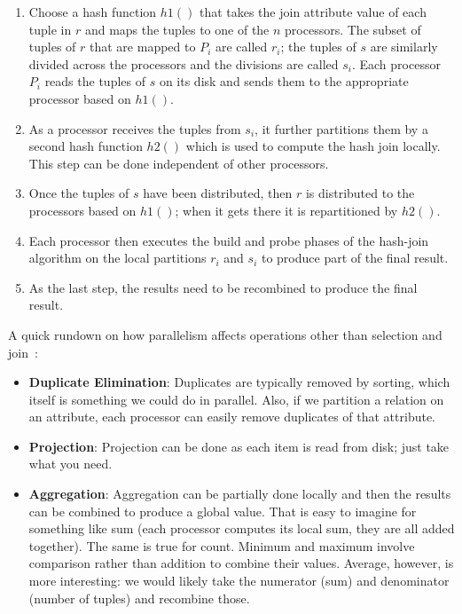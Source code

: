 \begin{enumerate}
	\item Choose a hash function $h1()$ that takes the join attribute value of each tuple in $r$ and maps the tuples to one of the $n$ processors. The subset of tuples of $r$ that are mapped to $P_{i}$ are called $r_{i}$; the tuples of $s$ are similarly divided across the processors and the divisions are called $s_{i}$. Each processor $P_{i}$ reads the tuples of $s$ on its disk and sends them to the appropriate processor based on $h1()$.
	\item As a processor receives the tuples from $s_{i}$, it further partitions them by a second hash function $h2()$ which is used to compute the hash join locally. This step can be done independent of other processors.
	\item Once the tuples of $s$ have been distributed, then $r$ is distributed to the processors based on $h1()$; when it gets there it is repartitioned by $h2()$.
	\item Each processor then executes the build and probe phases of the hash-join algorithm on the local partitions $r_{i}$ and $s_{i}$ to produce part of the final result.
	\item As the last step, the results need to be recombined to produce the final result.
\end{enumerate}

A quick rundown on how parallelism affects operations other than selection and join~\cite{dsc}:
\begin{itemize}
\item \textbf{Duplicate Elimination}: Duplicates are typically removed by sorting, which itself is something we could do in parallel. Also, if we partition a relation on an attribute, each processor can easily remove duplicates of that attribute.
\item \textbf{Projection}: Projection can be done as each item is read from disk; just take what you need.
\item \textbf{Aggregation}: Aggregation can be partially done locally and then the results can be combined to produce a global value. That is easy to imagine for something like sum (each processor computes its local sum, they are all added together). The same is true for count. Minimum and maximum involve comparison rather than addition to combine their values. Average, however, is more interesting: we would likely take the numerator (sum) and denominator (number of tuples) and recombine those.

\end{itemize}

